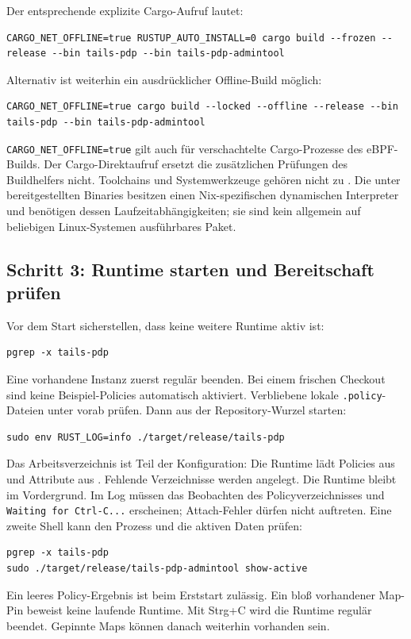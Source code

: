 \documentclass[12pt,a4paper]{article}
\begin{document}
Der entsprechende explizite Cargo-Aufruf lautet:
\begin{lstlisting}
CARGO_NET_OFFLINE=true RUSTUP_AUTO_INSTALL=0 cargo build --frozen --release --bin tails-pdp --bin tails-pdp-admintool
\end{lstlisting}
Alternativ ist weiterhin ein ausdrücklicher Offline-Build möglich:
\begin{lstlisting}
CARGO_NET_OFFLINE=true cargo build --locked --offline --release --bin tails-pdp --bin tails-pdp-admintool
\end{lstlisting}
\texttt{CARGO\_NET\_OFFLINE=true} gilt auch für verschachtelte Cargo-Prozesse des
eBPF-Builds. Der Cargo-Direktaufruf ersetzt die zusätzlichen Prüfungen des
Buildhelfers nicht. Toolchains und Systemwerkzeuge gehören nicht zu .
Die unter  bereitgestellten Binaries besitzen einen Nix-spezifischen
dynamischen Interpreter und benötigen dessen Laufzeitabhängigkeiten; sie sind kein
allgemein auf beliebigen Linux-Systemen ausführbares Paket.

\subsection{Schritt 3: Runtime starten und Bereitschaft prüfen}
Vor dem Start sicherstellen, dass keine weitere Runtime aktiv ist:
\begin{lstlisting}
pgrep -x tails-pdp
\end{lstlisting}
Eine vorhandene Instanz zuerst regulär beenden. Bei einem frischen Checkout sind
keine Beispiel-Policies automatisch aktiviert. Verbliebene lokale \texttt{.policy}-Dateien
unter  vorab prüfen. Dann aus der Repository-Wurzel starten:
\begin{lstlisting}
sudo env RUST_LOG=info ./target/release/tails-pdp
\end{lstlisting}
Das Arbeitsverzeichnis ist Teil der Konfiguration: Die Runtime lädt Policies aus
 und Attribute aus . Fehlende Verzeichnisse werden
angelegt. Die Runtime bleibt im Vordergrund. Im Log müssen das Beobachten des
Policyverzeichnisses und \texttt{Waiting for Ctrl-C...} erscheinen; Attach-Fehler
dürfen nicht auftreten. Eine zweite Shell kann den Prozess und die aktiven Daten
prüfen:
\begin{lstlisting}
pgrep -x tails-pdp
sudo ./target/release/tails-pdp-admintool show-active
\end{lstlisting}
Ein leeres Policy-Ergebnis ist beim Erststart zulässig. Ein bloß vorhandener Map-Pin
beweist keine laufende Runtime. Mit Strg+C wird die Runtime regulär beendet.
Gepinnte Maps können danach weiterhin vorhanden sein.
\end{document}

